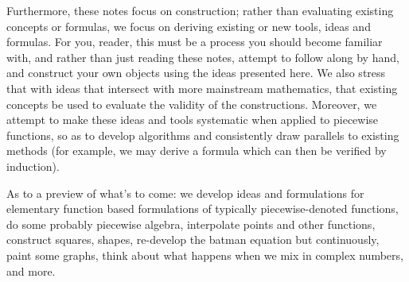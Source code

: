 Furthermore, these notes focus on construction; rather than evaluating existing concepts or formulas, we focus on deriving existing or new tools, ideas and formulas. For you, reader, this must be a process you should become familiar with, and rather than just reading these notes, attempt to follow along by hand, and construct your own objects using the ideas presented here. We also stress that with ideas that intersect with more mainstream mathematics, that existing concepts be used to evaluate the validity of the constructions. Moreover, we attempt to make these ideas and tools systematic when applied to piecewise functions, so as to develop algorithms and consistently draw parallels to existing methods (for example, we may derive a formula which can then be verified by induction).

As to a preview of what's to come: we develop ideas and formulations for elementary function based formulations of typically piecewise-denoted functions, do some probably piecewise algebra, interpolate points and other functions, construct squares, shapes, re-develop the batman equation but continuously, paint some graphs, think about what happens when we mix in complex numbers, and more.


\newpage